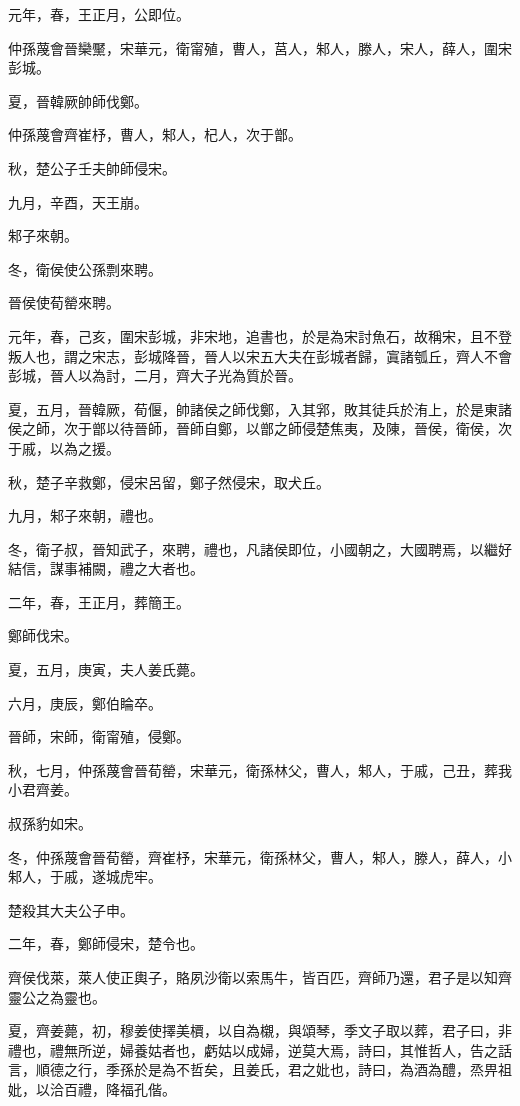 
\begin{pinyinscope}
元年，春，王正月，公即位。

仲孫蔑會晉欒黶，宋華元，衛甯殖，曹人，莒人，邾人，滕人，宋人，薛人，圍宋彭城。

夏，晉韓厥帥師伐鄭。

仲孫蔑會齊崔杼，曹人，邾人，杞人，次于鄫。

秋，楚公子壬夫帥師侵宋。

九月，辛酉，天王崩。

邾子來朝。

冬，衛侯使公孫剽來聘。

晉侯使荀罃來聘。

元年，春，己亥，圍宋彭城，非宋地，追書也，於是為宋討魚石，故稱宋，且不登叛人也，謂之宋志，彭城降晉，晉人以宋五大夫在彭城者歸，寘諸瓠丘，齊人不會彭城，晉人以為討，二月，齊大子光為質於晉。

夏，五月，晉韓厥，荀偃，帥諸侯之師伐鄭，入其郛，敗其徒兵於洧上，於是東諸侯之師，次于鄫以待晉師，晉師自鄭，以鄫之師侵楚焦夷，及陳，晉侯，衛侯，次于戚，以為之援。

秋，楚子辛救鄭，侵宋呂留，鄭子然侵宋，取犬丘。

九月，邾子來朝，禮也。

冬，衛子叔，晉知武子，來聘，禮也，凡諸侯即位，小國朝之，大國聘焉，以繼好結信，謀事補闕，禮之大者也。

二年，春，王正月，葬簡王。

鄭師伐宋。

夏，五月，庚寅，夫人姜氏薨。

六月，庚辰，鄭伯睔卒。

晉師，宋師，衛甯殖，侵鄭。

秋，七月，仲孫蔑會晉荀罃，宋華元，衛孫林父，曹人，邾人，于戚，己丑，葬我小君齊姜。

叔孫豹如宋。

冬，仲孫蔑會晉荀罃，齊崔杼，宋華元，衛孫林父，曹人，邾人，滕人，薛人，小邾人，于戚，遂城虎牢。

楚殺其大夫公子申。

二年，春，鄭師侵宋，楚令也。

齊侯伐萊，萊人使正輿子，賂夙沙衛以索馬牛，皆百匹，齊師乃還，君子是以知齊靈公之為靈也。

夏，齊姜薨，初，穆姜使擇美檟，以自為櫬，與頌琴，季文子取以葬，君子曰，非禮也，禮無所逆，婦養姑者也，虧姑以成婦，逆莫大焉，詩曰，其惟哲人，告之話言，順德之行，季孫於是為不哲矣，且姜氏，君之妣也，詩曰，為酒為醴，烝畀祖妣，以洽百禮，降福孔偕。


\end{pinyinscope}
